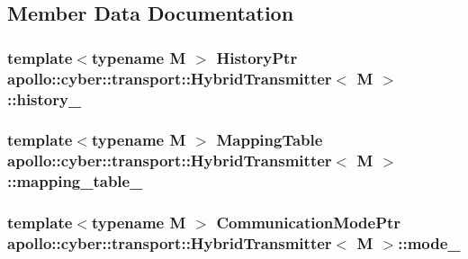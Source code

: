 \subsection{Member Data Documentation}
\hypertarget{classapollo_1_1cyber_1_1transport_1_1HybridTransmitter_a1017c9487fef9eabf20b6b6b29eda7a1}{
\subsubsection[{history\-\_\-}]{\setlength{\rightskip}{0pt plus 5cm}template$<$typename M $>$ {\bf History\-Ptr} {\bf apollo\-::cyber\-::transport\-::\-Hybrid\-Transmitter}$<$ M $>$\-::history\-\_\-\hspace{0.3cm}{\ttfamily [private]}}}\label{classapollo_1_1cyber_1_1transport_1_1HybridTransmitter_a1017c9487fef9eabf20b6b6b29eda7a1}
\hypertarget{classapollo_1_1cyber_1_1transport_1_1HybridTransmitter_a8002d94e9c7b130cc68cc7721e96a5e7}{
\subsubsection[{mapping\-\_\-table\-\_\-}]{\setlength{\rightskip}{0pt plus 5cm}template$<$typename M $>$ {\bf Mapping\-Table} {\bf apollo\-::cyber\-::transport\-::\-Hybrid\-Transmitter}$<$ M $>$\-::mapping\-\_\-table\-\_\-\hspace{0.3cm}{\ttfamily [private]}}}\label{classapollo_1_1cyber_1_1transport_1_1HybridTransmitter_a8002d94e9c7b130cc68cc7721e96a5e7}
\hypertarget{classapollo_1_1cyber_1_1transport_1_1HybridTransmitter_a81a8c87167bf743445c97e903e3bffd1}{
\subsubsection[{mode\-\_\-}]{\setlength{\rightskip}{0pt plus 5cm}template$<$typename M $>$ {\bf Communication\-Mode\-Ptr} {\bf apollo\-::cyber\-::transport\-::\-Hybrid\-Transmitter}$<$ M $>$\-::mode\-\_\-\hspace{0.3cm}{\ttfamily [private]}}}\label{classapollo_1_1cyber_1_1transport_1_1HybridTransmitter_a81a8c87167bf743445c97e903e3bffd1}
